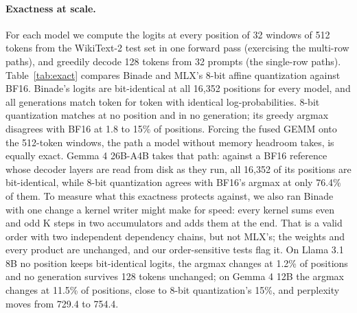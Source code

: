 \documentclass[11pt]{article}
\begin{document}
\paragraph{Exactness at scale.} For each model we compute the logits at every position of 32 windows of 512 tokens from the WikiText-2 test set in one forward pass (exercising the multi-row paths), and greedily decode 128 tokens from 32 prompts (the single-row paths). Table~\ref{tab:exact} compares Binade and MLX's 8-bit affine quantization against BF16. Binade's logits are bit-identical at all 16,352 positions for every model, and all generations match token for token with identical log-probabilities. 8-bit quantization matches at no position and in no generation; its greedy argmax disagrees with BF16 at 1.8 to 15\% of positions. Forcing the fused GEMM onto the 512-token windows, the path a model without memory headroom takes, is equally exact. Gemma 4 26B-A4B takes that path: against a BF16 reference whose decoder layers are read from disk as they run, all 16,352 of its positions are bit-identical, while 8-bit quantization agrees with BF16's argmax at only 76.4\% of them. To measure what this exactness protects against, we also ran Binade with one change a kernel writer might make for speed: every kernel sums even and odd K steps in two accumulators and adds them at the end. That is a valid order with two independent dependency chains, but not MLX's; the weights and every product are unchanged, and our order-sensitive tests flag it. On Llama 3.1 8B no position keeps bit-identical logits, the argmax changes at 1.2\% of positions and no generation survives 128 tokens unchanged; on Gemma 4 12B the argmax changes at 11.5\% of positions, close to 8-bit quantization's 15\%, and perplexity moves from 729.4 to 754.4.

\begin{table}[t]
\centering
\caption{Exactness against BF16 on WikiText-2 (32 windows of 512 tokens) and 32 greedy generations of 128 tokens. Binade, fused GEMM: the fused GEMM forced onto every prompt length. Two accumulators: the order ablation. $^\dagger$Windows only, against BF16 layers streamed from disk, since BF16 does not fit in memory.}
\label{tab:exact}
\resizebox{\linewidth}{!}{}
\end{table}
\end{document}
